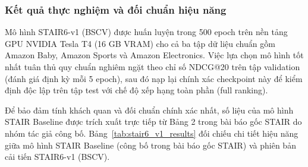 \subsubsection{Kết quả thực nghiệm và đối chuẩn hiệu năng}

Mô hình STAIR6-v1 (BSCV) được huấn luyện trong 500 epoch trên nền tảng GPU NVIDIA Tesla T4 (16 GB VRAM) cho cả ba tập dữ liệu chuẩn gồm Amazon Baby, Amazon Sports và Amazon Electronics. Việc lựa chọn mô hình tốt nhất tuân thủ quy chuẩn nghiêm ngặt theo chỉ số NDCG@20 trên tập validation (đánh giá định kỳ mỗi 5 epoch), sau đó nạp lại chính xác checkpoint này để kiểm định độc lập trên tập test với chế độ xếp hạng toàn phần (full ranking).

Để bảo đảm tính khách quan và đối chuẩn chính xác nhất, số liệu của mô hình STAIR Baseline được trích xuất trực tiếp từ Bảng 2 trong bài báo gốc STAIR do nhóm tác giả công bố. Bảng~\ref{tab:stair6_v1_results} đối chiếu chi tiết hiệu năng giữa mô hình STAIR Baseline (công bố trong bài báo gốc STAIR) và phiên bản cải tiến STAIR6-v1 (BSCV).

